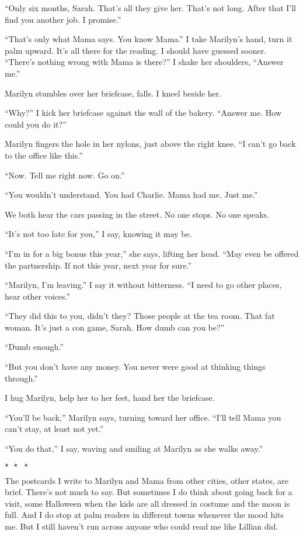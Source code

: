 \documentclass[twoside,10pt]{book}
\begin{document}
``Only six months, Sarah. That's all they give her. That's not long.
After that I'll find you another job. I promise.''

``That's only what Mama says. You know Mama.'' I take Marilyn's hand,
turn it palm upward. It's all there for the reading. I should have
guessed sooner. ``There's nothing wrong with Mama is there?'' I shake
her shoulders, ``Answer me.''

Marilyn stumbles over her briefcase, falls. I kneel beside her.

``Why?'' I kick her briefcase against the wall of the bakery. ``Answer
me. How could you do it?''

Marilyn fingers the hole in her nylons, just above the right knee. ``I
can't go back to the office like this.''

``Now. Tell me right now. Go on.''

``You wouldn't understand. You had Charlie. Mama had me. Just me.''

We both hear the cars passing in the street. No one stops. No one
speaks.

``It's not too late for you,'' I say, knowing it may be.

``I'm in for a big bonus this year,'' she says, lifting her head. ``May
even be offered the partner­ship. If not this year, next year for
sure.''

``Marilyn, I'm leaving.'' I say it without bitterness. ``I need to go
other places, hear other voices.''

``They did this to you, didn't they? Those people at the tea room. That
fat woman. It's just a con game, Sarah. How dumb can you be?''

``Dumb enough.''

``But you don't have any money. You never were good at thinking things
through.''

I hug Marilyn, help her to her feet, hand her the briefcase.

``You'll be back,'' Marilyn says, turning toward her office. ``I'll tell
Mama you can't stay, at least not yet.''

``You do that,'' I say, waving and smiling at Marilyn as she walks
away.''

\vspace*{-3pt}
{
  \large
\begin{center}
  $\star \ \ \star \ \ \star$
\end{center}
}
\vspace*{6pt}
The postcards I write to Marilyn and Mama from other cities, other
states, are brief. There's not much to say. But sometimes I do think
about going back for a visit, some Halloween when the kids are all
dressed in costume and the moon is full. And I do stop at palm readers
in different towns whenever the mood hits me. But I still haven't run
across anyone who could read me like Lillian did.
\end{document}
